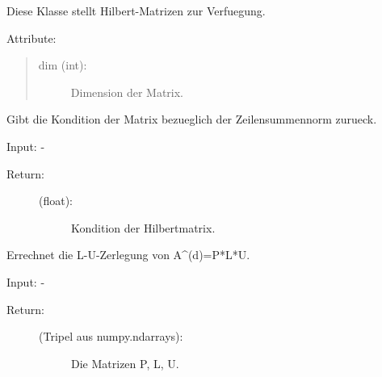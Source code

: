 \documentclass[letterpaper,10pt,ngerman]{sphinxmanual}
\begin{document}
\begin{fulllineitems}
\label{\detokenize{index:hilbertmatr.Hilbert}}
Diese Klasse stellt Hilbert-Matrizen zur Verfuegung.

Attribute:
\begin{quote}
\begin{description}
\item[{dim (int):}] \leavevmode
Dimension der Matrix.

\end{description}
\end{quote}

\begin{fulllineitems}
\label{\detokenize{index:hilbertmatr.Hilbert.kond_hil_zs}}
Gibt die Kondition der Matrix bezueglich der Zeilensummennorm zurueck.

Input: -
\begin{description}
\item[{Return:}] \leavevmode\begin{description}
\item[{(float):}] \leavevmode
Kondition der Hilbertmatrix.

\end{description}

\end{description}

\end{fulllineitems}


\begin{fulllineitems}
\label{\detokenize{index:hilbertmatr.Hilbert.l_u_zerl}}
Errechnet die L-U-Zerlegung von A\textasciicircum{}(d)=P*L*U.

Input: -
\begin{description}
\item[{Return:}] \leavevmode\begin{description}
\item[{(Tripel aus numpy.ndarrays):}] \leavevmode
Die Matrizen P, L, U.

\end{description}

\end{description}


\end{fulllineitems}
\end{fulllineitems}
\end{document}
